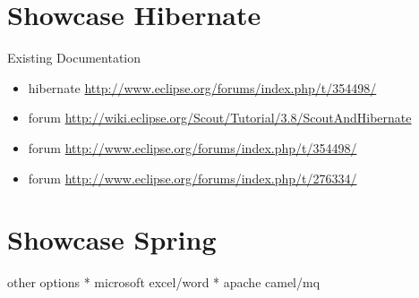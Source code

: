 \documentclass[a4paper,10pt,twoside]{book}
\begin{document}
\section{Showcase Hibernate}

\noindent Existing Documentation
\begin{itemize}
  \item hibernate \url{http://www.eclipse.org/forums/index.php/t/354498/}
  \item forum \url{http://wiki.eclipse.org/Scout/Tutorial/3.8/ScoutAndHibernate}
  \item forum \url{http://www.eclipse.org/forums/index.php/t/354498/}
  \item forum \url{http://www.eclipse.org/forums/index.php/t/276334/}
\end{itemize}

\section{Showcase Spring}

other options
  * microsoft excel/word
  * apache camel/mq
 
 
\ifx\wholebook\relax\else
   
   
\end{document}
